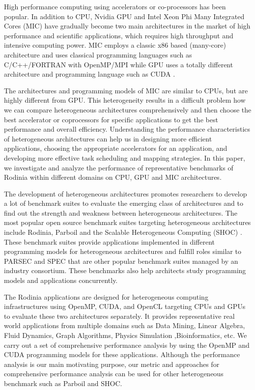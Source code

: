    \vspace{-1mm} 
High performance computing using accelerators or co-processors has been popular. In addition to CPU, Nvidia GPU and Intel Xeon Phi Many Integrated Cores (MIC) have gradually become two main architectures in the market of high performance and scientific applications, which requires high throughput and intensive computing power. MIC employs a classic x86 based (many-core) architecture and uses classical programming languages such as C/C++/FORTRAN with OpenMP/MPI \cite{R:6,R:20} while GPU uses a totally different architecture and programming language such as CUDA \cite{R:21}. 

The architectures and programming models of MIC are similar to CPUs, but are highly different from GPU. This heterogeneity results in a difficult problem how we can compare heterogeneous architectures comprehensively and then choose the best accelerator or coprocessors for specific applications to get the best performance and overall efficiency. Understanding the performance characteristics of heterogeneous architectures can help us in designing more efficient applications, choosing the appropriate accelerators for an application, and developing more effective task scheduling and mapping strategies. In this paper, we investigate and analyze the performance of representative benchmarks of Rodinia \cite{R:1} within different domains on CPU, GPU and MIC architectures. 

The development of heterogeneous architectures promotes researchers to develop a lot of benchmark suites to evaluate the emerging class of architectures and to find out the strength and weakness between heterogeneous architectures. The most popular open source benchmark suites targeting heterogeneous architectures include Rodinia, Parboil \cite{R:2} and the Scalable Heterogeneous Computing (SHOC) \cite{R:3}. These benchmark suites provide applications implemented in different programming models for heterogeneous architectures and fulfill roles similar to PARSEC \cite{R:4} and SPEC \cite{R:5} that are other popular benchmark suites managed by an industry consortium. These benchmarks also help architects study programming models and applications concurrently. 

The Rodinia applications are designed for heterogeneous computing infrastructures using OpenMP, CUDA, and OpenCL \cite{R:7} targeting CPUs and GPUs to evaluate these two architectures separately. It provides representative real world applications from multiple domains such as Data Mining, Linear Algebra, Fluid Dynamics, Graph Algorithms, Physics Simulation ,Bioinformatics, etc. We carry out a set of comprehensive performance analysis by using the OpenMP and CUDA programming models for these applications.  Although the performance analysis is our main motivating purpose, our metric and approaches for comprehensive performance analysis can be used for other heterogeneous benchmark such as Parboil and SHOC. 
  

